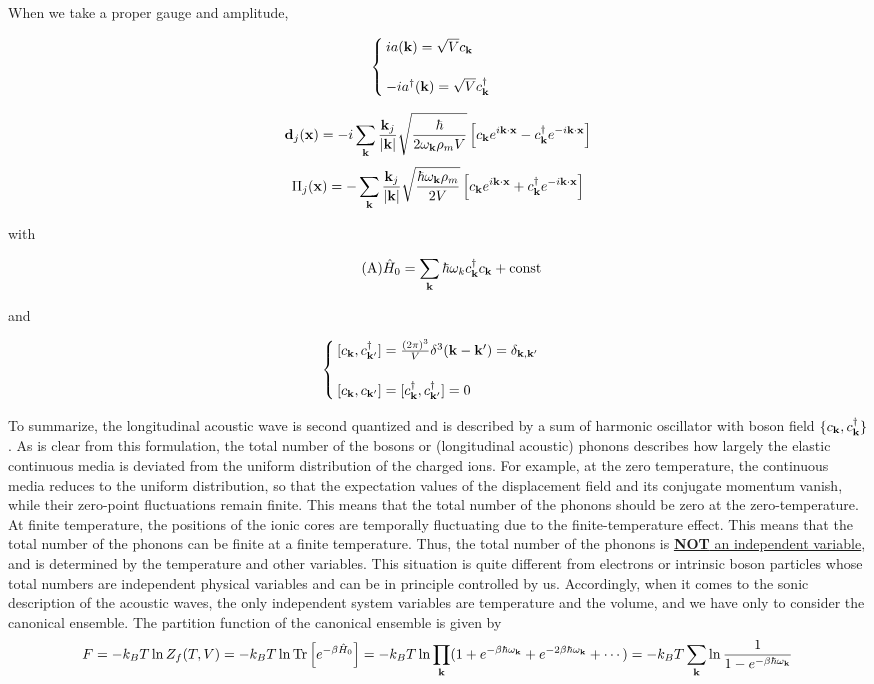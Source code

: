 When we take a proper gauge and amplitude,

\[\begin{cases}
ia({\bf k}) = \sqrt{V}c_{\bf k}\\
\ \\
-ia^\dagger({\bf k}) = \sqrt{V}c^\dagger_{\bf k}
\end{cases}\]

\[{\bf d}_j({\bf x}) = -i\sum_{\bf k}\frac{{\bf k}_j}{|{\bf k}|}\sqrt{\frac{\hbar}{2\omega_{\bf k}\rho_mV}}\left[c_{\bf k}e^{i\bf k\cdot x}-c^\dagger_{\bf k}e^{-i\bf k\cdot x}\right]\]
\[\Pi_j({\bf x}) = -\sum_{\bf k}\frac{{\bf k}_j}{|{\bf k}|}\sqrt{\frac{\hbar\omega_{\bf k}\rho_m}{2V}}\left[c_{\bf k}e^{i\bf k\cdot x}+c^\dagger_{\bf k}e^{-i\bf k\cdot x}\right]\]

with

\begin{align}\tag{A}\label{5A}
\hat{H}_0 = \sum_{\bf k}\hbar\omega_k c_{\bf k}^\dagger c_{\bf k}+\text{const}
\end{align}

and

\[\begin{cases}
[c_{\bf k},c^\dagger_{\bf k'}] = \frac{(2\pi)^3}{V}\delta^3({\bf k-k'}) = \delta_{\bf k,k'}\\
\ \\
[c_{\bf k},c_{\bf k'}] = [c^\dagger_{\bf k},c^\dagger_{\bf k'}] = 0
\end{cases}\]

To summarize, the longitudinal acoustic wave is second quantized and is described by a sum of harmonic oscillator with boson field $\{c_{\bf k},c^\dagger_{\bf k}\}$. As is clear from this formulation, the total number of the bosons or (longitudinal acoustic) phonons describes how largely the elastic continuous media is deviated from the uniform distribution of the charged ions. For example, at the zero temperature, the continuous media reduces to the uniform distribution, so that the expectation values of the displacement field and its conjugate momentum vanish, while their zero-point fluctuations remain finite. This means that the total number of the phonons should be zero at the zero-temperature. At finite temperature, the positions of the ionic cores are temporally fluctuating due to the finite-temperature effect. This means that the total number of the phonons can be finite at a finite temperature. Thus, the total number of the phonons is \uline{{\bf NOT} an independent variable}, and is determined by the temperature and other variables. This situation is quite different from electrons or intrinsic boson particles whose total numbers are independent physical variables and can be in principle controlled by us. Accordingly, when it comes to the sonic description of the acoustic waves, the only independent system variables are temperature and the volume, and we have only to consider the canonical ensemble. The partition function of the canonical ensemble is given by
\[F = -k_BT\ln Z_f(T,V) = -k_BT\ln\text{Tr}\left[e^{-\beta\hat{H}_0}\right] = -k_BT\ln\prod_{\bf k}(1+e^{-\beta\hbar\omega_{\bf k}} + e^{-2\beta\hbar\omega_{\bf k}} + \cdots) = -k_BT\sum_{\bf k}\ln\frac{1}{1-e^{-\beta\hbar\omega_{\bf k}}} \]

